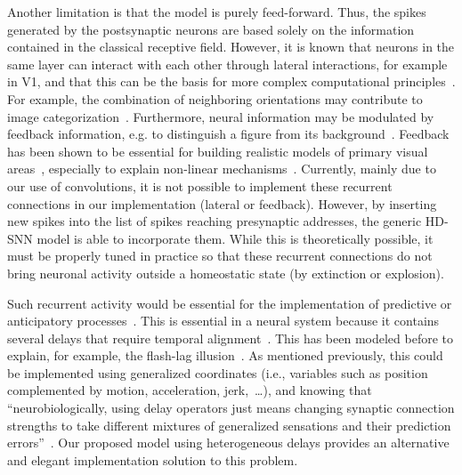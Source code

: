 \documentclass[default]{sn-jnl}%
\theoremstyle{thmstyleone}%
\theoremstyle{thmstyletwo}%
\theoremstyle{thmstylethree}%
\begin{document}
Another limitation is that the model is purely feed-forward. Thus, the spikes generated by the postsynaptic neurons are based solely on the information contained in the classical receptive field. However, it is known that neurons in the same layer can interact with each other through lateral interactions, for example in V1, and that this can be the basis for more complex computational principles~\citep{chavane_revisiting_2022}. For example, the combination of neighboring orientations may contribute to image categorization~\citep{perrinet_edge_2015}. Furthermore, neural information may be modulated by feedback information, e.g. to distinguish a figure from its background~\citep{roelfsema_early_2016}. Feedback has been shown to be essential for building realistic models of primary visual areas~\citep{boutin_sparse_2020, boutin_effect_2020}, especially to explain non-linear mechanisms~\citep{boutin_pooling_2022}. Currently, mainly due to our use of convolutions, it is not possible to implement these recurrent connections in our implementation (lateral or feedback). However, by inserting new spikes into the list of spikes reaching presynaptic addresses, the generic HD-SNN model is able to incorporate them. While this is theoretically possible, it must be properly tuned in practice so that these recurrent connections do not bring neuronal activity outside a homeostatic state (by extinction or explosion).

Such recurrent activity would be essential for the implementation of predictive or anticipatory processes~\citep{Benvenuti2020}. This is essential in a neural system because it contains several delays that require temporal alignment~\citep{hogendoorn_predictive_2019}. This has been modeled before to explain, for example, the flash-lag illusion~\citep{khoei_flash-lag_2017}. As mentioned previously, this could be implemented using generalized coordinates (i.e., variables such as position complemented by motion, acceleration, jerk,~\ldots), and  knowing that ``neurobiologically, using delay operators just means changing synaptic connection strengths to take different mixtures of generalized sensations and their prediction errors''~\citep{perrinet_active_2014}. Our proposed model using heterogeneous delays provides an alternative and elegant implementation solution to this problem.
%
\end{document}
